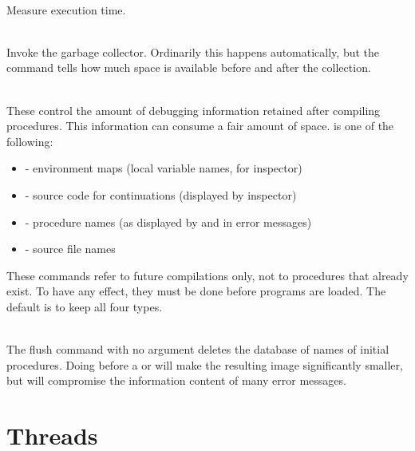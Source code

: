 \begin{description}
\item {}\\
    Measure execution time.

\item {}\\
    Invoke the garbage collector.  Ordinarily this happens
    automatically, but the command tells how much space is available
    before and after the collection.

\item {}
\T\vspace{-1em}
\item {}\\
    These control the amount of debugging information retained after
    compiling procedures.  This information can consume a fair amount
    of space.   is one of the following:
\begin{itemize}
\item {} - environment maps (local variable names, for inspector)
\item {} - source code for continuations (displayed by inspector)
\item {} - procedure names (as displayed by  and in error
       messages)
\item {}  - source file names
\end{itemize}
    These commands refer to future compilations only, not to procedures
    that already exist.  To have any effect, they must be done before
    programs are loaded.  The default is to keep all four types.

\item {}\\
    The flush command with no argument deletes the database of names
    of initial procedures.  Doing  before a  or
    will make the resulting image significantly smaller, but will
    compromise the information content of many error
    messages.
\end{description}

\section{Threads}

